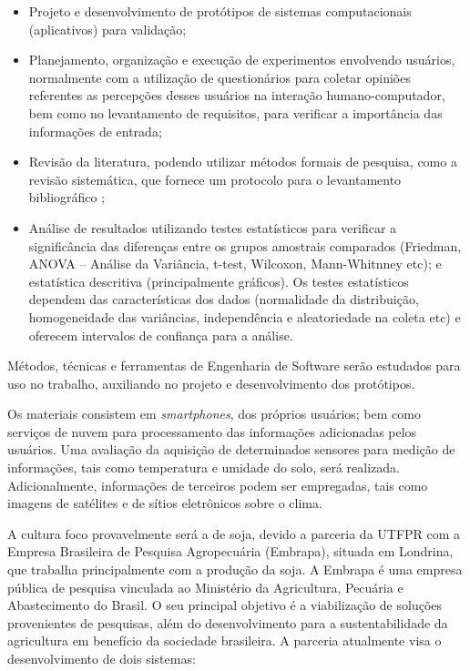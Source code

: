 \begin{itemize}
	\item Projeto e desenvolvimento de protótipos de sistemas computacionais (aplicativos) para validação;
	\item Planejamento, organização e execução de experimentos envolvendo usuários, normalmente com a utilização de questionários para coletar opiniões referentes as percepções desses usuários na interação humano-computador, bem como no levantamento de requisitos, para verificar a importância das informações de entrada;
	\item Revisão da literatura, podendo utilizar métodos formais de pesquisa, como a revisão sistemática, que fornece um protocolo para o levantamento bibliográfico \cite{Kitchenham:2004};
	\item Análise de resultados utilizando testes estatísticos para verificar a significância das diferenças entre os grupos amostrais comparados (Friedman, ANOVA – Análise da Variância, t-test, Wilcoxon, Mann-Whitnney etc); e estatística descritiva (principalmente gráficos). Os testes estatísticos dependem das características dos dados (normalidade da distribuição, homogeneidade das variâncias, independência e aleatoriedade na coleta etc) e oferecem intervalos de confiança para a análise.
\end{itemize}

Métodos, técnicas e ferramentas de Engenharia de Software serão estudados para uso no trabalho, auxiliando no projeto e desenvolvimento dos protótipos.

Os materiais consistem em \textit{smartphones}, dos próprios usuários; bem como serviços de nuvem para processamento das informações adicionadas pelos usuários. Uma avaliação da aquisição de determinados sensores para medição de informações, tais como temperatura e umidade do solo, será realizada. Adicionalmente, informações de terceiros podem ser empregadas, tais como imagens de satélites e de sítios eletrônicos sobre o clima. 		

A cultura foco provavelmente será a de soja, devido a parceria da UTFPR com a Empresa Brasileira de Pesquisa Agropecuária (Embrapa), situada em Londrina, que trabalha principalmente com a produção da soja. A Embrapa é uma empresa pública de pesquisa vinculada ao Ministério da Agricultura, Pecuária e Abastecimento do Brasil. O seu principal objetivo é a viabilização de soluções provenientes de pesquisas, além do desenvolvimento para a sustentabilidade da agricultura em benefício da sociedade brasileira. A parceria atualmente visa o desenvolvimento de dois sistemas:

